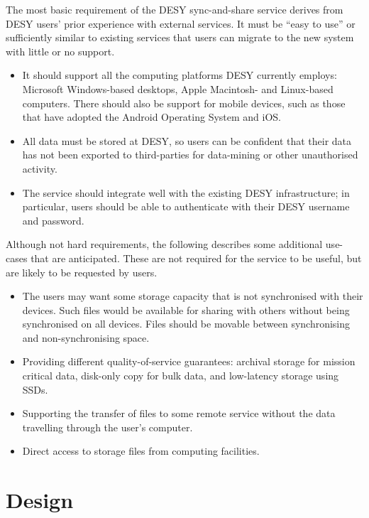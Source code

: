 \documentclass[a4paper]{jpconf}
\begin{document}
The most basic requirement of the DESY sync-and-share service derives
from DESY users' prior experience with external services.  It must be
``easy to use'' or sufficiently similar to existing services that
users can migrate to the new system with little or no support.

\begin{itemize}
\item
It should support all the computing platforms DESY currently employs:
Microsoft Windows-based desktops, Apple Macintosh- and Linux-based
computers.  There should also be support for mobile devices, such as
those that have adopted the Android Operating System and iOS.

\item
All data must be stored at DESY, so users can be confident that their
data has not been exported to third-parties for data-mining or other
unauthorised activity.

\item
The service should integrate well with the existing DESY
infrastructure; in particular, users should be able to authenticate
with their DESY username and password.
\end{itemize}

Although not hard requirements, the following describes some
additional use-cases that are anticipated.  These are not required for
the service to be useful, but are likely to be requested by users.

\begin{itemize}
\item
The users may want some storage capacity that is not synchronised with
their devices.  Such files would be available for sharing with others
without being synchronised on all devices.  Files should be movable
between synchronising and non-synchronising space.

\item
Providing different quality-of-service guarantees: archival storage
for mission critical data, disk-only copy for bulk data, and
low-latency storage using SSDs.

\item
Supporting the transfer of files to some remote service without the
data travelling through the user's computer.

\item
 Direct access to storage files from computing facilities.
\end{itemize}

\section{Design}
\end{document}
